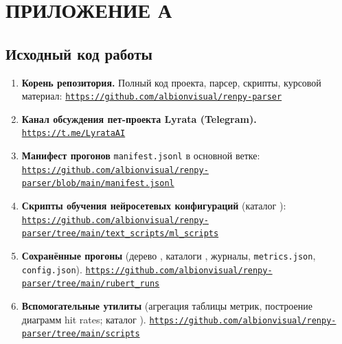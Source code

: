 \chapter*{ПРИЛОЖЕНИЕ А}

\section*{\centering Исходный код работы}
\label{app:repo-structure}

\begin{enumerate}[label=\textbf{\arabic*.},wide=0pt,leftmargin=*]
\item\label{appa:elem1}\hypertarget{appa-i-1}{}\textbf{Корень репозитория.} Полный код проекта, парсер, скрипты, курсовой материал: \href{https://github.com/albionvisual/renpy-parser}{\nolinkurl{https://github.com/albionvisual/renpy-parser}}

\item\label{appa:elem2}\hypertarget{appa-i-2}{}\textbf{Канал обсуждения пет-проекта Lyrata (Telegram).} \href{https://t.me/LyrataAI}{\nolinkurl{https://t.me/LyrataAI}}

\item\label{appa:elem3}\hypertarget{appa-i-3}{}\textbf{Манифест прогонов} \texttt{manifest.jsonl} в основной ветке: \href{https://github.com/albionvisual/renpy-parser/blob/main/manifest.jsonl}{\nolinkurl{https://github.com/albionvisual/renpy-parser/blob/main/manifest.jsonl}}

\item\label{appa:elem4}\hypertarget{appa-i-4}{}\textbf{Скрипты обучения нейросетевых конфигураций} (каталог ): \href{https://github.com/albionvisual/renpy-parser/tree/main/text_scripts/ml_scripts}{\nolinkurl{https://github.com/albionvisual/renpy-parser/tree/main/text_scripts/ml_scripts}}

\item\label{appa:elem5}\hypertarget{appa-i-5}{}\textbf{Сохранённые прогоны} (дерево , каталоги , журналы, \texttt{metrics.json}, \texttt{config.json}). \href{https://github.com/albionvisual/renpy-parser/tree/main/rubert_runs}{\nolinkurl{https://github.com/albionvisual/renpy-parser/tree/main/rubert_runs}}

\item\label{appa:elem6}\hypertarget{appa-i-6}{}\textbf{Вспомогательные утилиты} (агрегация таблицы метрик, построение диаграмм hit rates; каталог ). \href{https://github.com/albionvisual/renpy-parser/tree/main/scripts}{\nolinkurl{https://github.com/albionvisual/renpy-parser/tree/main/scripts}}


\end{enumerate}
